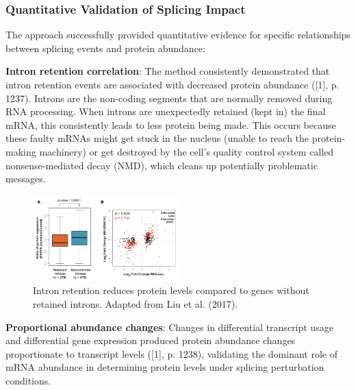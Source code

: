\documentclass[12pt,a4paper]{article}
\begin{document}
\subsubsection{Quantitative Validation of Splicing Impact}

The approach successfully provided quantitative evidence for specific relationships between splicing events and protein abundance:

\textbf{Intron retention correlation}: The method consistently demonstrated that intron retention events are associated with decreased protein abundance ([1], p. 1237). Introns are the non-coding segments that are normally removed during RNA processing. When introns are unexpectedly retained (kept in) the final mRNA, this consistently leads to less protein being made. This occurs because these faulty mRNAs might get stuck in the nucleus (unable to reach the protein-making machinery) or get destroyed by the cell's quality control system called nonsense-mediated decay (NMD), which cleans up potentially problematic messages.

\begin{figure}[H]
\centering
\includegraphics[width=0.5\textwidth]{intron_retention_figure_6_liu.png}
\caption{Intron retention reduces protein levels compared to genes without retained introns. Adapted from Liu et al. (2017).}
\label{fig:intron_retention}
\end{figure}

\textbf{Proportional abundance changes}: Changes in differential transcript usage and differential gene expression produced protein abundance changes proportionate to transcript levels ([1], p. 1238), validating the dominant role of mRNA abundance in determining protein levels under splicing perturbation conditions.
\end{document}
